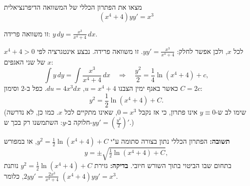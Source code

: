 
\begin{question}
מצאו את הפתרון הכללי של המשוואה הדיפרנציאלית
\[ (x^4 + 4)yy' = x^3 \]
\end{question}

\begin{hint}
זו משוואה פרידה: $y\,dy = \frac{x^3}{x^4 + 4}\,dx$.
\end{hint}

\begin{solution}
$x^4 + 4 > 0$ לכל $x$, ולכן אפשר לחלק: $y y' = \frac{x^3}{x^4 + 4}$. זו משוואה פרידה. נבצע אינטגרציה לפי $x$ של שני האגפים:
\[ \int y\,dy = \int\frac{x^3}{x^4 + 4}\,dx \quad\Longrightarrow\quad \frac{y^2}{2} = \frac14\ln(x^4 + 4) + c, \]
כאשר באגף ימין הצבנו $u = x^4 + 4$, $du = 4x^3dx$. כפל ב-$2$ וסימון $C = 2c$:
\[ y^2 = \frac12\ln(x^4 + 4) + C. \]
(שימו לב ש-$y\equiv0$ אינו פתרון, כי אז נקבל $0 = x^3$, שאינו מתקיים לכל $x$. כמו כן, לא נדרשה חלוקה ב-$y$: השתמשנו רק בכך ש-$yy' = \left(\frac{y^2}{2}\right)'$.)

\textbf{תשובה:} הפתרון הכללי נתון בצורה סתומה ע"י $y^2 = \frac12\ln(x^4+4) + C$, או במפורש
\[ y = \pm\sqrt{\tfrac12\ln(x^4 + 4) + C}, \]
בתחום שבו הביטוי בתוך השורש חיובי. \textbf{בדיקה:} גזירת $y^2 = \frac12\ln(x^4+4)+C$ נותנת $2yy' = \frac{2x^3}{x^4+4}$, כלומר $(x^4+4)yy' = x^3$.
\end{solution}
